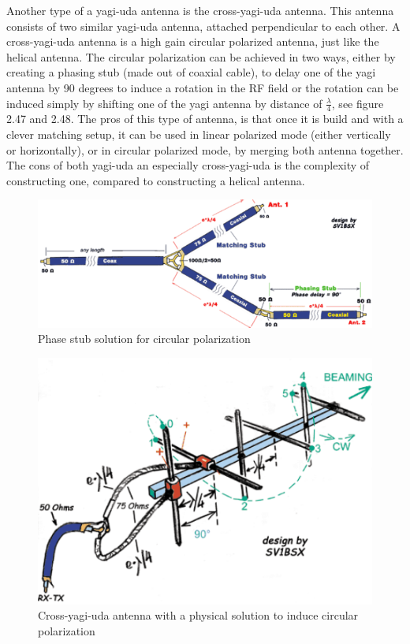 Another type of a yagi-uda antenna is the cross-yagi-uda antenna. This antenna consists of two similar yagi-uda antenna, attached perpendicular to each other. A cross-yagi-uda antenna is a high gain circular polarized antenna, just like the helical antenna. The circular polarization can be achieved in two ways, either by creating a phasing stub (made out of coaxial cable), to delay one of the yagi antenna by 90 degrees to induce a rotation in the RF field or the rotation can be induced simply by shifting one of the yagi antenna by distance of $\frac{\lambda}{4}$, see figure 2.47 and 2.48. The pros of this type of antenna, is that once it is build and with a clever matching setup, it can be used in linear polarized mode (either vertically or horizontally), or in circular polarized mode, by merging both antenna together. The cons of both yagi-uda an especially cross-yagi-uda is the complexity of constructing one, compared to constructing a helical antenna. 

\begin{figure}[h]
\centering
\includegraphics[scale=0.8]{figures/PhaseStub.PNG}
\caption{Phase stub solution for circular polarization\cite{YagiMatching}}
\end{figure}

\begin{figure}[h]
\centering
\includegraphics[scale=0.75]{figures/CrossYagi.PNG}
\caption{Cross-yagi-uda antenna with a physical solution to induce circular polarization\cite{YagiMatching}}
\end{figure}

